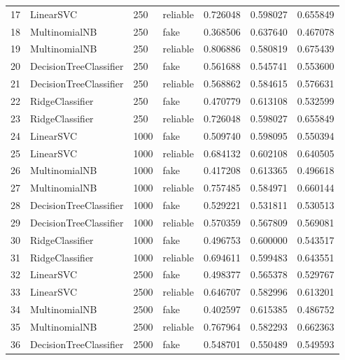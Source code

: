 \begin{longtable}{llllrrr}
17 &               LinearSVC &          250 &  reliable &  0.726048 &   0.598027 &  0.655849 \\
18 &           MultinomialNB &          250 &      fake &  0.368506 &   0.637640 &  0.467078 \\
19 &           MultinomialNB &          250 &  reliable &  0.806886 &   0.580819 &  0.675439 \\
20 &  DecisionTreeClassifier &          250 &      fake &  0.561688 &   0.545741 &  0.553600 \\
21 &  DecisionTreeClassifier &          250 &  reliable &  0.568862 &   0.584615 &  0.576631 \\
22 &         RidgeClassifier &          250 &      fake &  0.470779 &   0.613108 &  0.532599 \\
23 &         RidgeClassifier &          250 &  reliable &  0.726048 &   0.598027 &  0.655849 \\
24 &               LinearSVC &         1000 &      fake &  0.509740 &   0.598095 &  0.550394 \\
25 &               LinearSVC &         1000 &  reliable &  0.684132 &   0.602108 &  0.640505 \\
26 &           MultinomialNB &         1000 &      fake &  0.417208 &   0.613365 &  0.496618 \\
27 &           MultinomialNB &         1000 &  reliable &  0.757485 &   0.584971 &  0.660144 \\
28 &  DecisionTreeClassifier &         1000 &      fake &  0.529221 &   0.531811 &  0.530513 \\
29 &  DecisionTreeClassifier &         1000 &  reliable &  0.570359 &   0.567809 &  0.569081 \\
30 &         RidgeClassifier &         1000 &      fake &  0.496753 &   0.600000 &  0.543517 \\
31 &         RidgeClassifier &         1000 &  reliable &  0.694611 &   0.599483 &  0.643551 \\
32 &               LinearSVC &         2500 &      fake &  0.498377 &   0.565378 &  0.529767 \\
33 &               LinearSVC &         2500 &  reliable &  0.646707 &   0.582996 &  0.613201 \\
34 &           MultinomialNB &         2500 &      fake &  0.402597 &   0.615385 &  0.486752 \\
35 &           MultinomialNB &         2500 &  reliable &  0.767964 &   0.582293 &  0.662363 \\
36 &  DecisionTreeClassifier &         2500 &      fake &  0.548701 &   0.550489 &  0.549593 \\

\end{longtable}
